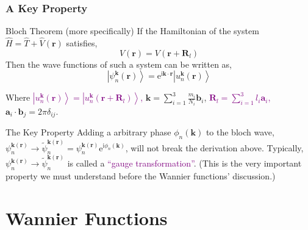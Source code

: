 \documentclass{beamer}
\begin{document}
  \begin{frame}
    \frametitle{A Key Property}

    \begin{block}{Bloch Theorem (more specifically)}
      \small
      If the Hamiltonian of the system \(\widehat{H} = \widehat{T} + \widehat{V}(\mathbf{r})\) satisfies, 
      \begin{equation*}
        V(\mathbf{r}) = V(\mathbf{r}+\mathbf{R}_l)
      \end{equation*}
      Then the wave functions of such a system can be written as,
      \begin{equation*}
        \left|\psi_n^{\mathbf{k}}(\mathbf{r})\right\rangle = \mathrm{e}^{\mathrm{i}\mathbf{k}\cdot\mathbf{r}}\left|u_n^{\mathbf{k}}(\mathbf{r})\right\rangle
      \end{equation*}
      
      Where  \textcolor{purple}{\(\left|u_n^{\mathbf{k}}(\mathbf{r})\right\rangle = \left|u_n^{\mathbf{k}}(\mathbf{r}+\mathbf{R}_l)\right\rangle\),} \(\mathbf{k} = \sum_{i=1}^3\frac{m_i}{N_i}\mathbf{b}_i\), \textcolor{purple}{\(\mathbf{R}_l = \sum_{i=1}^3l_i\mathbf{a}_i\),} \(\mathbf{a}_i\cdot\mathbf{b}_j = 2\pi\delta_{ij}\).
    \end{block}

    \begin{block}{The Key Property}
      \small
      Adding a arbitrary phase \(\phi_n(\mathbf{k})\) to the bloch wave, \(\psi_n^{\mathbf{k}(\mathbf{r})} \to \tilde\psi_n^{\mathbf{k}(\mathbf{r})} = \psi_n^{\mathbf{k}(\mathbf{r})}\mathrm{e}^{\mathrm{i}\phi_n(\mathbf{k})}\),  will not break the derivation above. Typically, \(\psi_n^{\mathbf{k}(\mathbf{r})} \to \tilde\psi_n^{\mathbf{k}(\mathbf{r})}\) is called a \textcolor{purple}{``gauge transformation''}. (This is the very important property we must understand before the Wannier functions' discussion.)
    \end{block}

    \end{frame}

  \section{Wannier Functions}
\end{document}
